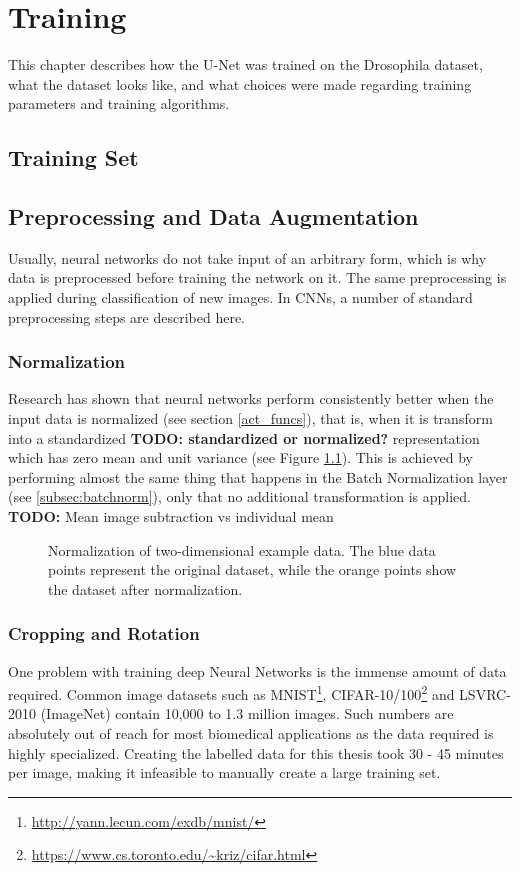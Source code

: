 	\chapter{Training}
This chapter describes how the U-Net was trained on the Drosophila dataset, what the dataset looks like, and what choices were made regarding training parameters and training algorithms.


	\section{Training Set}


	\section {Preprocessing and Data Augmentation}
Usually, neural networks do not take input of an arbitrary form, which is why data is  preprocessed before training the network on it. The same preprocessing is applied during classification of new images. In CNNs, a number of standard preprocessing steps are described here.


		\subsection{Normalization}
Research \cite{lecun_norm} has shown that neural networks perform consistently better when the input data is normalized (see section \ref{act_funcs}), that is, when it is transform into a standardized \textbf{TODO: standardized or normalized?} representation which has zero mean and unit variance (see Figure \ref{fig:norma}). This is achieved by performing almost the same thing that happens in the Batch Normalization layer (see \ref{subsec:batchnorm}), only that no additional transformation is applied. \textbf{TODO:} Mean image subtraction vs individual mean

\begin {figure}[!ht]
	\begin{center}
		
	\end{center}
	\caption[]{Normalization of two-dimensional example data. The blue data points represent the original dataset, while the orange points show the dataset after normalization.}
	\label{fig:norma}
\end {figure}


		\subsection{Cropping and Rotation}
One problem with training deep Neural Networks is the immense amount of data required. Common image datasets such as MNIST\footnote{\url{http://yann.lecun.com/exdb/mnist/}}, CIFAR-10/100\footnote{\url{https://www.cs.toronto.edu/~kriz/cifar.html}} and LSVRC-2010 (ImageNet)\cite{ILSVRC} contain 10,000 to 1.3 million images. Such numbers are absolutely out of reach for most biomedical applications as the data required is highly specialized. Creating the labelled data for this thesis took 30 - 45 minutes per image, making it infeasible to manually create a large training set.

